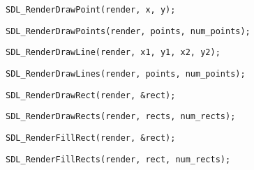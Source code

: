 \documentclass{article}
\begin{document}
\begin{lstlisting}
SDL_RenderDrawPoint(render, x, y);
\end{lstlisting}
\begin{lstlisting}
SDL_RenderDrawPoints(render, points, num_points);
\end{lstlisting}
\begin{lstlisting}
SDL_RenderDrawLine(render, x1, y1, x2, y2);
\end{lstlisting}
\begin{lstlisting}
SDL_RenderDrawLines(render, points, num_points);
\end{lstlisting}
\begin{lstlisting}
SDL_RenderDrawRect(render, &rect);
\end{lstlisting}
\begin{lstlisting}
SDL_RenderDrawRects(render, rects, num_rects);
\end{lstlisting}
\begin{lstlisting}
SDL_RenderFillRect(render, &rect);
\end{lstlisting}
\begin{lstlisting}
SDL_RenderFillRects(render, rect, num_rects);
\end{lstlisting}
\end{document}
